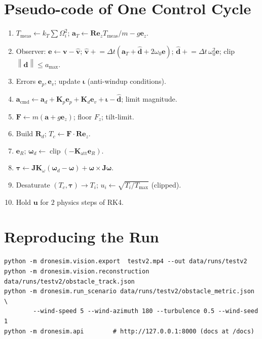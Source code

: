 \documentclass[11pt,a4paper]{article}
\newcommand{\vc}[1]{\bm{#1}}
\newcommand{\ez}{\vc{e}_z}
\newcommand{\norm}[1]{\left\lVert #1\right\rVert}
\newcommand{\hatv}[1]{\widehat{#1}}
\DeclareMathOperator{\clip}{clip}
\begin{document}
\appendix
\section{Pseudo-code of One Control Cycle}
\begin{enumerate}[label=\arabic*.]
\item $T_{\text{meas}}\gets k_T\sum\Omega_i^2$; $\vc a_T\gets\vc R\ez T_{\text{meas}}/m-g\ez$.
\item Observer: $\vc e\gets\vc v-\hatv{\vc v}$; $\hatv{\vc v}\mathrel{+}=\Delta t(\vc a_T+\hatv{\vc d}+2\omega_0\vc e)$; $\hatv{\vc d}\mathrel{+}=\Delta t\,\omega_0^2\vc e$; clip $\norm{\hatv{\vc d}}\le a_{\max}$.
\item Errors $\vc e_p,\vc e_v$; update $\vc\iota$ (anti-windup conditions).
\item $\vc a_{\text{cmd}}\gets\vc a_d+\vc K_p\vc e_p+\vc K_d\vc e_v+\vc\iota-\hatv{\vc d}$; limit magnitude.
\item $\vc F\gets m(\vc a+g\ez)$; floor $F_z$; tilt-limit.
\item Build $\vc R_d$; $T_c\gets\vc F\cdot\vc R\ez$.
\item $\vc e_R$; $\vc\omega_d\gets\clip(-\vc K_{\text{att}}\vc e_R)$.
\item $\vc\tau\gets\vc J\vc K_\omega(\vc\omega_d-\vc\omega)+\vc\omega\times\vc J\vc\omega$.
\item Desaturate $(T_c,\vc\tau)\to T_i$; $u_i\gets\sqrt{T_i/T_{\max}}$ (clipped).
\item Hold $\vc u$ for $2$ physics steps of RK4.
\end{enumerate}

\section{Reproducing the Run}
\begin{verbatim}
python -m dronesim.vision.export  testv2.mp4 --out data/runs/testv2
python -m dronesim.vision.reconstruction data/runs/testv2/obstacle_track.json
python -m dronesim.run_scenario data/runs/testv2/obstacle_metric.json \
        --wind-speed 5 --wind-azimuth 180 --turbulence 0.5 --wind-seed 1
python -m dronesim.api        # http://127.0.0.1:8000 (docs at /docs)
\end{verbatim}
\end{document}
